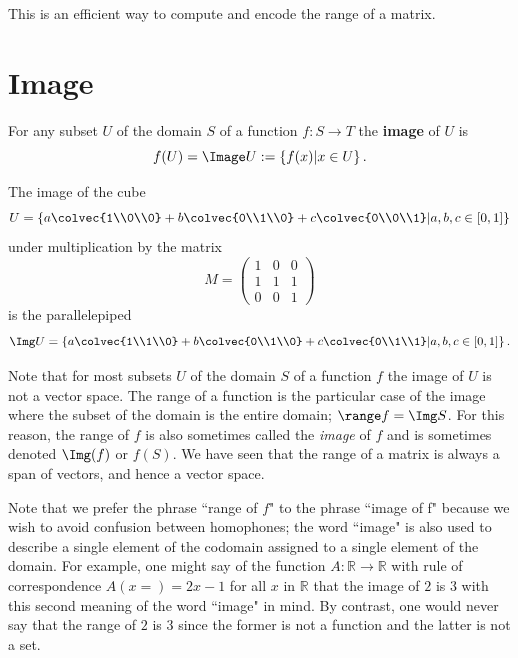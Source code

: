 \noindent
This is an efficient way to compute and encode the range of a matrix.

\section{Image} 

\begin{definition}
For any subset $U$ of the domain $S$ of a function $f:S\to T$  the {\bfseries image} of $U$ is 
\[f(U)=\Image U:= \left\{  f(x) | x\in U \right\} .\]
\end{definition}

\begin{example} 
The image of the  cube
\[U= \left\{  a \colvec{1\\0\\0} +b \colvec{0\\1\\0}+c\colvec{0\\0\\1} \middle| a,b,c \in [0,1] \right\} \] 
under multiplication by the matrix 
\[ M=
\begin{pmatrix}
1&0&0\\
1&1&1\\
0&0&1
\end{pmatrix}
\]
is the parallelepiped 
\[
\Img U= 
 \left\{  a \colvec{1\\1\\0} +b \colvec{0\\1\\0}+c\colvec{0\\1\\1} \middle| a,b,c \in [0,1] \right\} .
\]
\end{example}

Note that for most subsets $U$ of the domain $S$  of a function  $f$ the image of $U$ is not a vector space. 
The range of a function is the particular case of the image where the subset of the domain is the entire domain; $\range  f = \Img S$. 
For this reason, the range of $f$ is also sometimes called the \emph{image} of $f$ and is sometimes denoted $\Img(f)$ or  $f(S).$  We have seen that the range of a matrix is always a span of vectors, and hence a vector space. 

Note that we prefer the phrase ``range of $f$" to the phrase ``image of f"  
because we wish to avoid confusion between homophones;
 the word 
``image" is also used to describe a single element of the codomain assigned to a single element of the domain. 
For example, 
one might say of 
the function $A:\mathbb{R}\to\mathbb{R}$ with rule of correspondence $A(x=)=2x-1$ for all $x$ in $\mathbb{R}$ that the image of $2$ is $3$ with this second meaning of the word ``image" in mind. 
By contrast, one would never say that the range of $2$ is $3$ since the former is not a function and the latter is not a set.


